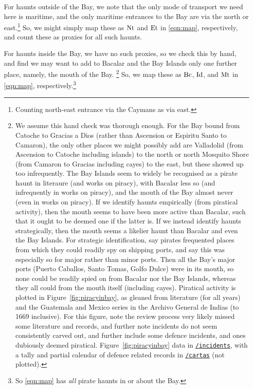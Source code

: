 		For haunts outside of the Bay, we note that the only mode of transport we need here is maritime, and the only maritime entrances to the Bay are via the north or east.\footnote{Counting north-east entrance via the Caymans as via east.} So, we might simply map these as \(\operatorname{Nt}\) and \(\operatorname{Et}\) in \ref{eqn:map}, respectively, and count these as proxies for all such haunts.
	
		For haunts inside the Bay, we have no such proxies, so we check this by hand, and find we may want to add to Bacalar and the Bay Islands only one further place, namely, the mouth of the Bay.%
		\footnote{We assume this hand check was thorough enough. For the Bay bound from Catoche to Gracias a Dios (rather than Ascension or Espiritu Santo to Camaron), the only other places we might possibly add are Valladolid (from Ascension to Catoche including islands) to the north or north Mosquito Shore (from Camaron to Gracias including cayes) to the east, but these showed up too infrequently. The Bay Islands seem to widely be recognised as a pirate haunt in literaure (and works on piracy), with Bacalar less so (and infrequently in works on piracy), and the mouth of the Bay almost never (even in works on piracy). If we identify haunts empirically (from piratical activity), then the mouth seems to have been more active than Bacalar, such that it ought to be deemed one if the latter is. If we instead identify haunts strategically, then the mouth seems a likelier haunt than Bacalar and even the Bay Islands. For strategic identification, say pirates frequented places from which they could readily spy on shipping ports, and say this was especially so for major rather than minor ports. Then all the Bay's major ports (Puerto Caballos, Santo Tomas, Golfo Dulce) were in its mouth, so none could be readily spied on from Bacalar nor the Bay Islands, whereas they all could from the mouth itself (including cayes). Piratical activity is plotted in Figure~\ref{fig:piracyinbay}, as gleaned from literature (for all years) and the Guatemala and Mexico series in the Archivo General de Indias (to 1669 inclusive). For this figure, note the review process very likely missed some literature and records, and further note incidents do not seem consistently carved out, and further include some defence incidents, and ones dubiously deemed piratical. Figure~\ref{fig:piracyinbay} data in \href{https://github.com/aenavidad/pp-0/tree/main/incidents}{\nolinkurl{/incidents}}, with a tally and partial calendar of defence related records in \href{https://github.com/aenavidad/pp-0/tree/main/cartas}{\nolinkurl{/cartas}} (not plotted).}
		So, we map these as \(\operatorname{Bc}\), \(\operatorname{Id}\), and \(\operatorname{Mt}\) in \ref{eqn:map}, respectively.\footnote{So \ref{eqn:map} has \emph{all} pirate haunts in or about the Bay.}
	
